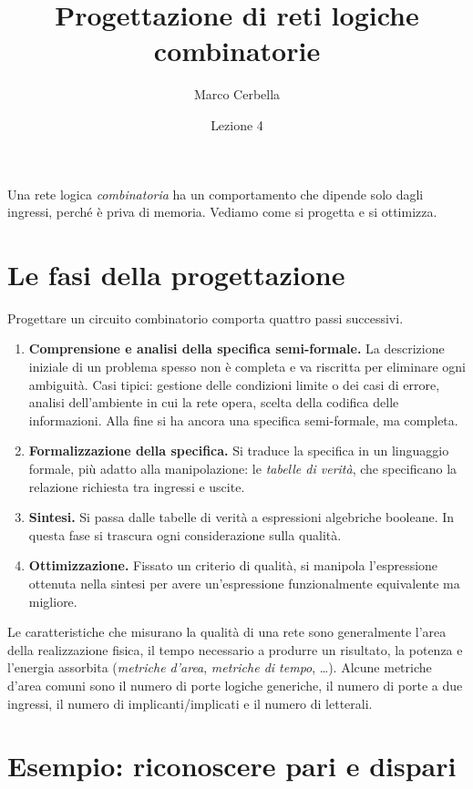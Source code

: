 \documentclass[11pt,a4paper]{article}
\title{Progettazione di reti logiche combinatorie}
\author{Marco Cerbella}
\date{Lezione 4}
\begin{document}
\maketitle

Una rete logica \emph{combinatoria} ha un comportamento che dipende solo dagli ingressi, perché è priva di memoria. Vediamo come si progetta e si ottimizza.

\section{Le fasi della progettazione}

Progettare un circuito combinatorio comporta quattro passi successivi.

\begin{enumerate}
    \item \textbf{Comprensione e analisi della specifica semi-formale.} La descrizione iniziale di un problema spesso non è completa e va riscritta per eliminare ogni ambiguità. Casi tipici: gestione delle condizioni limite o dei casi di errore, analisi dell'ambiente in cui la rete opera, scelta della codifica delle informazioni. Alla fine si ha ancora una specifica semi-formale, ma completa.
    \item \textbf{Formalizzazione della specifica.} Si traduce la specifica in un linguaggio formale, più adatto alla manipolazione: le \emph{tabelle di verità}, che specificano la relazione richiesta tra ingressi e uscite.
    \item \textbf{Sintesi.} Si passa dalle tabelle di verità a espressioni algebriche booleane. In questa fase si trascura ogni considerazione sulla qualità.
    \item \textbf{Ottimizzazione.} Fissato un criterio di qualità, si manipola l'espressione ottenuta nella sintesi per avere un'espressione funzionalmente equivalente ma migliore.
\end{enumerate}

Le caratteristiche che misurano la qualità di una rete sono generalmente l'area della realizzazione fisica, il tempo necessario a produrre un risultato, la potenza e l'energia assorbita (\emph{metriche d'area}, \emph{metriche di tempo}, \dots). Alcune metriche d'area comuni sono il numero di porte logiche generiche, il numero di porte a due ingressi, il numero di implicanti/implicati e il numero di letterali.

\section{Esempio: riconoscere pari e dispari}
\end{document}
